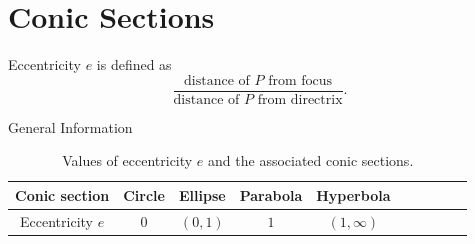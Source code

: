 \chapter{Conic Sections}
\begin{definition}{}{}
  Eccentricity \(e\) is defined as 
  \[\frac{\text{distance of \(P\) from focus}}{\text{distance of \(P\) from directrix}}.\]
\end{definition}
\begin{stbox}{General Information}{}
  \begin{table}[H]
    \centering
    \begin{tabular}{ScScScScSc}
      \toprule
      Conic section & Circle & Ellipse & Parabola & Hyperbola\\
      \midrule
      Eccentricity \(e\) & \(0\) & \((0,1)\) & \(1\) & \((1,\infty)\)\\
      \bottomrule
    \end{tabular}
    \caption{Values of eccentricity \(e\) and the associated conic sections.}
    \label{table:eccentricity-associated-conics}
  \end{table}
\end{stbox}
